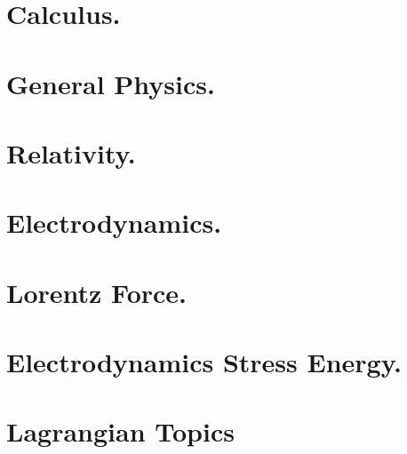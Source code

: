 \documentclass[12pt,leqno]{book}
\begin{document}
\part{Calculus.}








\part{General Physics.}









\part{Relativity.}








\part{Electrodynamics.}


















\part{Lorentz Force.}




\part{Electrodynamics Stress Energy.}








\part{Lagrangian Topics}


\end{document}
